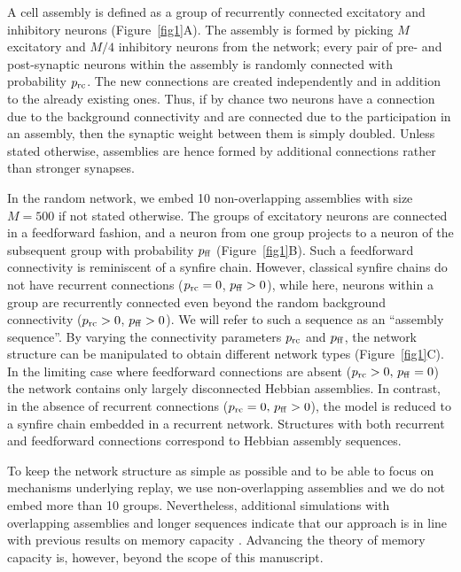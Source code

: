     A cell assembly is defined as a group of recurrently connected excitatory
    and inhibitory neurons (Figure~\ref{fig1}A). The assembly is formed by picking
    $M$ excitatory and $M/4$ inhibitory neurons from the network; every pair of
    pre- and post-synaptic neurons within the assembly is randomly connected
    with probability $p_{\rm rc}$. The new connections are created
    independently and in addition to the already existing ones. Thus, if by
    chance two neurons have a connection due to the background connectivity and
    are connected due to the participation in an assembly, then the synaptic
    weight between them is simply doubled. Unless stated otherwise, assemblies
    are hence formed by additional connections rather than stronger synapses.

    In the random network, we embed 10 non-overlapping assemblies with size
    $M=500$ if not stated otherwise. The groups of excitatory neurons are
    connected in a feedforward fashion, and a neuron from one group projects to
    a neuron of the subsequent group with probability $p_{\rm ff}$
    (Figure~\ref{fig1}B). Such a feedforward connectivity is reminiscent of a
    synfire chain. However, classical synfire chains do not have recurrent
    connections ($p_{\rm rc}=0$, $p_{\rm ff}>0$), while here, neurons within a
    group are recurrently connected even beyond the random background
    connectivity ($p_{\rm rc}>0$, $p_{\rm ff}>0$). We will refer to such a
    sequence as an ``assembly sequence''. By varying the connectivity
    parameters $p_{\rm rc}$ and $p_{\rm ff}$, the network structure can be
    manipulated to obtain different network types (Figure~\ref{fig1}C).  In the
    limiting case where feedforward connections are absent ($ p_{\rm rc}>0,\,
    p_{\rm ff}=0$) the network contains only largely disconnected Hebbian
    assemblies. In contrast, in the absence of recurrent connections ($p_{\rm
    rc}=0,\, p_{\rm ff}>0$), the model is reduced to a synfire chain embedded
    in a recurrent network. Structures with both recurrent and feedforward
    connections correspond to Hebbian assembly sequences.

    To keep the network structure as simple as possible and to be able to focus
    on mechanisms underlying replay, we use non-overlapping assemblies and we
    do not embed more than 10 groups. Nevertheless, additional simulations with
    overlapping assemblies and longer sequences indicate that our approach is
    in line with previous results on memory capacity \citep{Leibold2006,
    Leibold2008, Trengove2013}. Advancing the theory of memory capacity is,
    however, beyond the scope of this manuscript.
    
